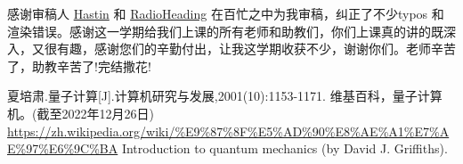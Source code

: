 \documentclass[fontset=windows]{article}
\begin{document}
感谢审稿人 \href{https://hastin-blog.cn/}{Hastin} 和 \href{https://github.com/Radioheading}{RadioHeading} 在百忙之中为我审稿，纠正了不少typos 和渲染错误。感谢这一学期给我们上课的所有老师和助教们，你们上课真的讲的既深入，又很有趣，感谢您们的辛勤付出，让我这学期收获不少，谢谢你们。老师辛苦了，助教辛苦了!完结撒花!


\begin{thebibliography}{30}  

    夏培肃.量子计算[J].计算机研究与发展,2001(10):1153-1171.
    维基百科，量子计算机。(截至2022年12月26日) \url{https://zh.wikipedia.org/wiki/%E9%87%8F%E5%AD%90%E8%AE%A1%E7%AE%97%E6%9C%BA}
    Introduction to quantum mechanics (by David J. Griffiths).
    \end{thebibliography}
\end{document}
